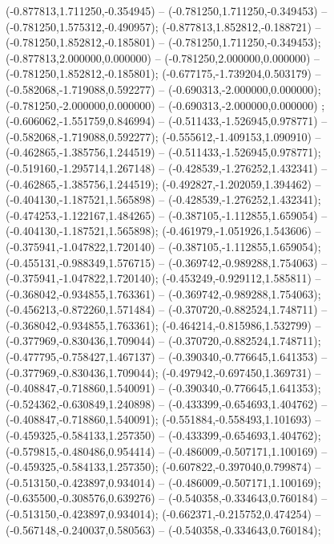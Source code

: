  (-0.877813,1.711250,-0.354945) -- (-0.781250,1.711250,-0.349453) -- (-0.781250,1.575312,-0.490957);
 (-0.877813,1.852812,-0.188721) -- (-0.781250,1.852812,-0.185801) -- (-0.781250,1.711250,-0.349453);
 (-0.877813,2.000000,0.000000) -- (-0.781250,2.000000,0.000000) -- (-0.781250,1.852812,-0.185801);
 (-0.677175,-1.739204,0.503179) -- (-0.582068,-1.719088,0.592277) -- (-0.690313,-2.000000,0.000000);
 (-0.781250,-2.000000,0.000000) -- (-0.690313,-2.000000,0.000000) ;
 (-0.606062,-1.551759,0.846994) -- (-0.511433,-1.526945,0.978771) -- (-0.582068,-1.719088,0.592277);
 (-0.555612,-1.409153,1.090910) -- (-0.462865,-1.385756,1.244519) -- (-0.511433,-1.526945,0.978771);
 (-0.519160,-1.295714,1.267148) -- (-0.428539,-1.276252,1.432341) -- (-0.462865,-1.385756,1.244519);
 (-0.492827,-1.202059,1.394462) -- (-0.404130,-1.187521,1.565898) -- (-0.428539,-1.276252,1.432341);
 (-0.474253,-1.122167,1.484265) -- (-0.387105,-1.112855,1.659054) -- (-0.404130,-1.187521,1.565898);
 (-0.461979,-1.051926,1.543606) -- (-0.375941,-1.047822,1.720140) -- (-0.387105,-1.112855,1.659054);
 (-0.455131,-0.988349,1.576715) -- (-0.369742,-0.989288,1.754063) -- (-0.375941,-1.047822,1.720140);
 (-0.453249,-0.929112,1.585811) -- (-0.368042,-0.934855,1.763361) -- (-0.369742,-0.989288,1.754063);
 (-0.456213,-0.872260,1.571484) -- (-0.370720,-0.882524,1.748711) -- (-0.368042,-0.934855,1.763361);
 (-0.464214,-0.815986,1.532799) -- (-0.377969,-0.830436,1.709044) -- (-0.370720,-0.882524,1.748711);
 (-0.477795,-0.758427,1.467137) -- (-0.390340,-0.776645,1.641353) -- (-0.377969,-0.830436,1.709044);
 (-0.497942,-0.697450,1.369731) -- (-0.408847,-0.718860,1.540091) -- (-0.390340,-0.776645,1.641353);
 (-0.524362,-0.630849,1.240898) -- (-0.433399,-0.654693,1.404762) -- (-0.408847,-0.718860,1.540091);
 (-0.551884,-0.558493,1.101693) -- (-0.459325,-0.584133,1.257350) -- (-0.433399,-0.654693,1.404762);
 (-0.579815,-0.480486,0.954414) -- (-0.486009,-0.507171,1.100169) -- (-0.459325,-0.584133,1.257350);
 (-0.607822,-0.397040,0.799874) -- (-0.513150,-0.423897,0.934014) -- (-0.486009,-0.507171,1.100169);
 (-0.635500,-0.308576,0.639276) -- (-0.540358,-0.334643,0.760184) -- (-0.513150,-0.423897,0.934014);
 (-0.662371,-0.215752,0.474254) -- (-0.567148,-0.240037,0.580563) -- (-0.540358,-0.334643,0.760184);
